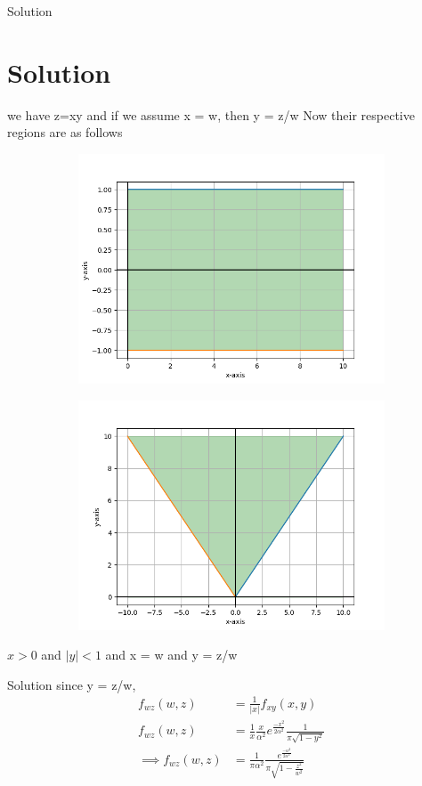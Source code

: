 \documentclass{beamer}
\theoremstyle{remark}
\numberwithin{equation}{subsection}
\begin{document}
\begin{frame}{Solution}
    \section{Solution}
    we have z=xy and if we assume x = w, then y = z/w \newline
    Now their respective regions are as follows
    \begin{figure}
        \centering
        \begin{subfigure}{\textwidth}
            \centering
            \includegraphics[width=0.4\linewidth]{Graph}
            \label{fig:sub1}
        \end{subfigure}%
    \begin{subfigure}{\textwidth}
        \centering
        \includegraphics[width=0.4\linewidth]{Graph2}
        \label{fig:sub2}
    \end{subfigure}
    \label{fig:test}
\end{figure}
$x>0$ and $|y| < 1$ and x = w and y = z/w
\end{frame}

\begin{frame}{Solution}
    since y = z/w,
    \begin{align}
        f_{wz}(w, z) &= \frac{1}{|x|}f_{xy}(x, y) \\
        f_{wz}(w, z) &= \frac{1}{x} \frac{x}{\alpha^2}e^{\frac{-x^2}{2\alpha^2}} \frac{1}{\pi \sqrt{1 - y^2}} \\
        \implies f_{wz}(w, z) &= \frac{1}{\pi \alpha^2}\frac{e^{\frac{-w^2}{2\alpha^2}}}{\pi \sqrt{1 - \frac{z^2}{w^2}}}
    \end{align}
\end{frame}
\end{document}
